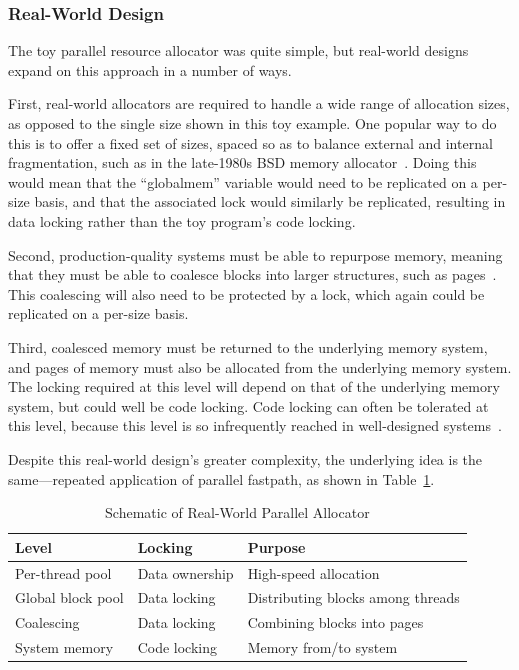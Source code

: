 \subsubsection{Real-World Design}

The toy parallel resource allocator was quite simple, but real-world
designs expand on this approach in a number of ways.

First, real-world allocators are required to handle a wide range
of allocation sizes, as opposed to the single size shown in this
toy example.
One popular way to do this is to offer a fixed set of sizes, spaced
so as to balance external and internal fragmentation, such as in
the late-1980s BSD memory allocator~\cite{McKusick88}.
Doing this would mean that the ``globalmem'' variable would need
to be replicated on a per-size basis, and that the associated
lock would similarly be replicated, resulting in data locking
rather than the toy program's code locking.

Second, production-quality systems must be able to repurpose memory,
meaning that they must be able to coalesce blocks into larger structures,
such as pages~\cite{McKenney93}.
This coalescing will also need to be protected by a lock, which again
could be replicated on a per-size basis.

Third, coalesced memory must be returned to the underlying memory
system, and pages of memory must also be allocated from the underlying
memory system.
The locking required at this level will depend on that of the underlying
memory system, but could well be code locking.
Code locking can often be tolerated at this level, because this
level is so infrequently reached in well-designed systems~\cite{McKenney01e}.

Despite this real-world design's greater complexity, the underlying
idea is the same---repeated application of parallel fastpath,
as shown in
Table~\ref{fig:app:questions:Schematic of Real-World Parallel Allocator}.

\begin{table}[tbp]
\small
\centering
\renewcommand*{\arraystretch}{1.25}
\begin{tabularx}{\twocolumnwidth}{ll>{\raggedright\arraybackslash}X}
\toprule
Level	& Locking & Purpose \\
\midrule
Per-thread pool	  & Data ownership & High-speed allocation \\
Global block pool & Data locking   & Distributing blocks among threads \\
Coalescing	  & Data locking   & Combining blocks into pages \\
System memory	  & Code locking   & Memory from/to system \\
\bottomrule
\end{tabularx}
\caption{Schematic of Real-World Parallel Allocator}
\label{fig:app:questions:Schematic of Real-World Parallel Allocator}
\end{table}


